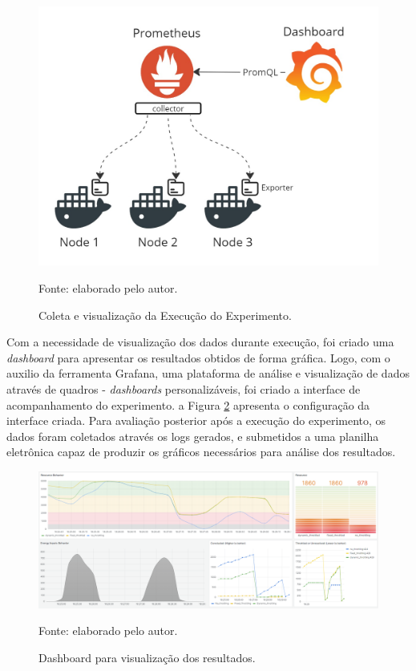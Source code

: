 \begin{figure}[H]
	\centering
	
	\caption{Coleta e visualização da Execução do Experimento.}
	\label{fig:cap6instrumentalizacao}
	\noindent\includegraphics[width=0.75\linewidth]{Imagens/cap6/cap6instrumentalizacao.jpg} 
	
	Fonte: elaborado pelo autor.
\end{figure}


Com a necessidade de visualização dos dados durante execução, foi criado uma \textit{dashboard}  para apresentar os resultados obtidos de forma gráfica. Logo, com o auxilio da ferramenta Grafana, uma plataforma de análise e visualização de dados através de quadros - \textit{dashboards} personalizáveis, foi criado a interface de acompanhamento do experimento. a Figura \ref{fig:cap6bashboard} apresenta o configuração da interface criada. Para avaliação  posterior após a execução do experimento, os dados foram coletados através os logs gerados, e submetidos a uma planilha eletrônica capaz de produzir os gráficos necessários para análise dos resultados. 

\begin{figure}[H]
	\centering
	
	\caption{Dashboard para visualização dos resultados.}
	\label{fig:cap6bashboard}
	\noindent\includegraphics[width=1\linewidth]{Imagens/cap6/cap6dashboard.png} 
	
	Fonte: elaborado pelo autor.
\end{figure}

